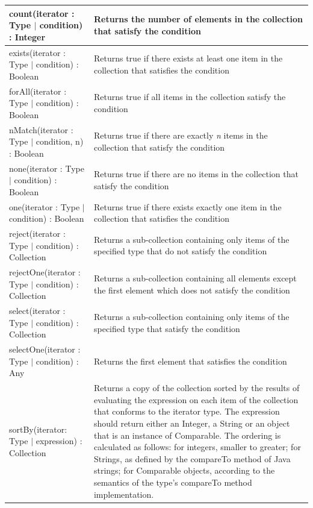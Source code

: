 \begin{longtabu} {|p{6.5cm}|X|}
    count(iterator : Type $|$ condition) : Integer & Returns the number of elements in the collection that satisfy the condition \\\hline
    
    exists(iterator : Type $|$ condition) : Boolean & Returns true if there exists at least one item in the collection that satisfies the condition \\\hline
    
    forAll(iterator : Type $|$ condition) : Boolean & Returns true if all items in the collection satisfy the condition \\\hline
    
    nMatch(iterator : Type $|$ condition, n) : Boolean & Returns true if there are exactly \emph{n} items in the collection that satisfy the condition \\\hline
    
    none(iterator : Type $|$ condition) : Boolean & Returns true if there are no items in the collection that satisfy the condition \\\hline
    
    one(iterator : Type $|$ condition) : Boolean & Returns true if there exists exactly one item in the collection that satisfies the condition \\\hline

    reject(iterator : Type $|$ condition) : Collection & Returns a sub-collection containing only items of the specified type that do not satisfy the condition \\\hline
    
    rejectOne(iterator : Type $|$ condition) : Collection & Returns a sub-collection containing all elements except the first element which does not satisfy the condition \\\hline
    
    select(iterator : Type $|$ condition) : Collection & Returns a sub-collection containing only items of the specified type that satisfy the condition \\\hline
    
    selectOne(iterator : Type $|$ condition) : Any & Returns the first element that satisfies the condition \\\hline
    
    sortBy(iterator: Type $|$ expression) : Collection & Returns a copy of the collection sorted by the results of evaluating the expression on each item of the collection that conforms to the iterator type. The expression should return either an Integer, a String or an object that is an instance of Comparable. The ordering is calculated as follows: for integers, smaller to greater; for Strings, as defined by the compareTo method of Java strings; for Comparable objects, according to the semantics of the type's compareTo method implementation.  \\\hline
\end{longtabu}

